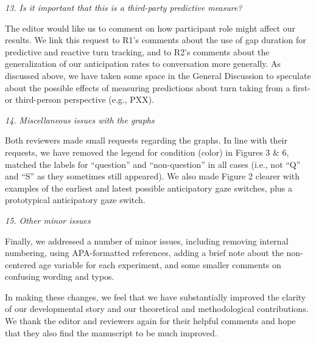 \documentclass[11pt,a4paper]{letter} %
\begin{document}
\begin{letter}{}
\noindent \textit{13. Is it important that this is a third-party predictive measure?}

\noindent The editor would like us to comment on how participant role might affect our results. We link this request to R1's comments about the use of gap duration for predictive and reactive turn tracking, and to R2's comments about the generalization of our anticipation rates to conversation more generally. As discussed above, we have taken some space in the General Discussion to speculate about the possible effects of measuring predictions about turn taking from a first- or third-person perspective (e.g., PXX).

\noindent \textit{14. Miscellaneous issues with the graphs}

\noindent Both reviewers made small requests regarding the graphs. In line with their requests, we have removed the legend for condition (color) in Figures 3 \& 6, matched the labels for ``question'' and ``non-question'' in all cases (i.e., not ``Q'' and ``S'' as they sometimes still appeared). We also made Figure 2 clearer with examples of the earliest and latest possible anticipatory gaze switches, plus a prototypical anticipatory gaze switch.

\noindent \textit{15. Other minor issues}

\noindent Finally, we addressed a number of minor issues, including removing internal numbering, using APA-formatted references, adding a brief note about the non-centered age variable for each experiment, and some smaller comments on confusing wording and typos.

\medskip

\noindent In making these changes, we feel that we have substantially improved the clarity of our developmental story and our theoretical and methodological contributions. We thank the editor and reviewers again for their helpful comments and hope that they also find the manuscript to be much improved.


\end{letter}
\end{document}

